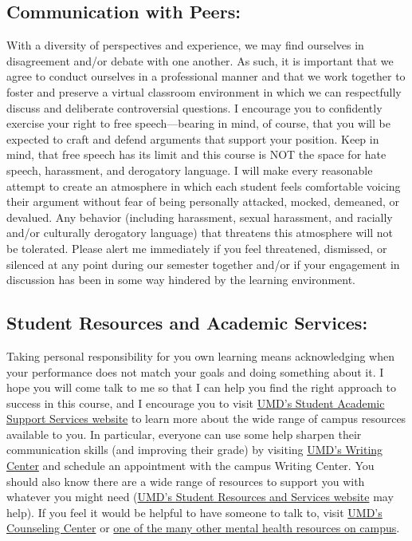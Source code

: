 \documentclass[
]{book}
\begin{document}
\hypertarget{communication-with-peers}{%
\subsection{Communication with Peers:}\label{communication-with-peers}}

With a diversity of perspectives and experience, we may find ourselves in disagreement and/or debate with one another. As such, it is important that we agree to conduct ourselves in a professional manner and that we work together to foster and preserve a virtual classroom environment in which we can respectfully discuss and deliberate controversial questions. I encourage you to confidently exercise your right to free speech---bearing in mind, of course, that you will be expected to craft and defend arguments that support your position. Keep in mind, that free speech has its limit and this course is NOT the space for hate speech, harassment, and derogatory language. I will make every reasonable attempt to create an atmosphere in which each student feels comfortable voicing their argument without fear of being personally attacked, mocked, demeaned, or devalued. Any behavior (including harassment, sexual harassment, and racially and/or culturally derogatory language) that threatens this atmosphere will not be tolerated. Please alert me immediately if you feel threatened, dismissed, or silenced at any point during our semester together and/or if your engagement in discussion has been in some way hindered by the learning environment.

\hypertarget{student-resources-and-academic-services}{%
\subsection{Student Resources and Academic Services:}\label{student-resources-and-academic-services}}

Taking personal responsibility for you own learning means acknowledging when your performance does not match your goals and doing something about it. I hope you will come talk to me so that I can help you find the right approach to success in this course, and I encourage you to visit \href{http://tutoring.umd.edu}{UMD's Student Academic Support Services website} to learn more about the wide range of campus resources available to you. In particular, everyone can use some help sharpen their communication skills (and improving their grade) by visiting \href{http://www.english.umd.edu/academics/writingcenter/schedule}{UMD's Writing Center} and schedule an appointment with the campus Writing Center. You should also know there are a wide range of resources to support you with whatever you might need (\href{https://sph.umd.edu/content/student-resources-and-services}{UMD's Student Resources and Services website} may help). If you feel it would be helpful to have someone to talk to, visit \href{https://www.counseling.umd.edu/}{UMD's Counseling Center} or \href{https://tltc.umd.edu/supporting-whole-student}{one of the many other mental health resources on campus}.
\end{document}
